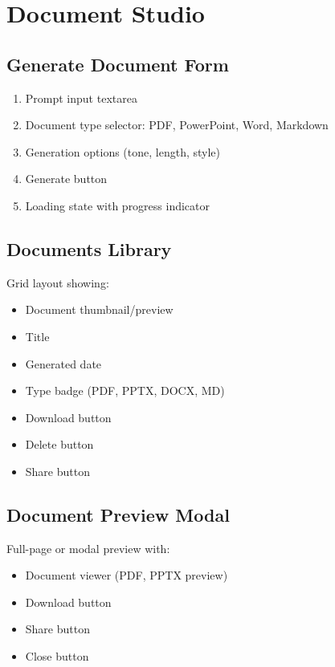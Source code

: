 \documentclass{report}
\begin{document}
\section{Document Studio}

\subsection{Generate Document Form}

\begin{enumerate}
    \item Prompt input textarea
    \item Document type selector: PDF, PowerPoint, Word, Markdown
    \item Generation options (tone, length, style)
    \item Generate button
    \item Loading state with progress indicator
\end{enumerate}

\subsection{Documents Library}

Grid layout showing:
\begin{itemize}
    \item Document thumbnail/preview
    \item Title
    \item Generated date
    \item Type badge (PDF, PPTX, DOCX, MD)
    \item Download button
    \item Delete button
    \item Share button
\end{itemize}

\subsection{Document Preview Modal}

Full-page or modal preview with:
\begin{itemize}
    \item Document viewer (PDF, PPTX preview)
    \item Download button
    \item Share button
    \item Close button
\end{itemize}
\end{document}
